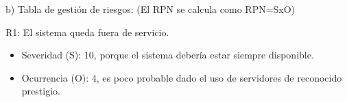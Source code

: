 \documentclass[11pt]{charter}
\begin{document}
b) Tabla de gestión de riesgos:      (El RPN se calcula como RPN=SxO)

R1: El sistema queda fuera de servicio.
\begin{itemize}
\item Severidad (S): 10, porque el sistema debería estar siempre disponible.
\item Ocurrencia (O): 4, es poco probable dado el uso de servidores de reconocido prestigio.
\end{itemize}
\end{document}
